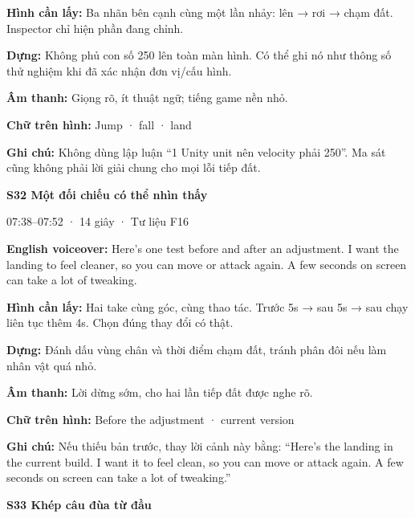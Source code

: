 \documentclass[10pt,a4paper]{article}
\begin{document}
\textbf{Hình cần lấy:}  Ba nhãn bên cạnh cùng một lần nhảy: lên → rơi → chạm đất. Inspector chỉ hiện phần đang chỉnh.\par

\textbf{Dựng:}  Không phủ con số 250 lên toàn màn hình. Có thể ghi nó như thông số thử nghiệm khi đã xác nhận đơn vị/cấu hình.\par

\textbf{Âm thanh:}  Giọng rõ, ít thuật ngữ; tiếng game nền nhỏ.\par

\textbf{Chữ trên hình:}  Jump · fall · land\par

\textbf{Ghi chú:}  Không dùng lập luận “1 Unity unit nên velocity phải 250”. Ma sát cũng không phải lời giải chung cho mọi lỗi tiếp đất.\par

\clearpage

\textbf{S32 Một đối chiếu có thể nhìn thấy}\par

07:38–07:52 · 14 giây · Tư liệu F16\par

\textbf{English voiceover:}  Here’s one test before and after an adjustment. I want the landing to feel cleaner, so you can move or attack again. A few seconds on screen can take a lot of tweaking.\par

\textbf{Hình cần lấy:}  Hai take cùng góc, cùng thao tác. Trước 5s → sau 5s → sau chạy liên tục thêm 4s. Chọn đúng thay đổi có thật.\par

\textbf{Dựng:}  Đánh dấu vùng chân và thời điểm chạm đất, tránh phân đôi nếu làm nhân vật quá nhỏ.\par

\textbf{Âm thanh:}  Lời dừng sớm, cho hai lần tiếp đất được nghe rõ.\par

\textbf{Chữ trên hình:}  Before the adjustment · current version\par

\textbf{Ghi chú:}  Nếu thiếu bản trước, thay lời cảnh này bằng: “Here’s the landing in the current build. I want it to feel clean, so you can move or attack again. A few seconds on screen can take a lot of tweaking.”\par

\textbf{S33 Khép câu đùa từ đầu}\par
\end{document}
